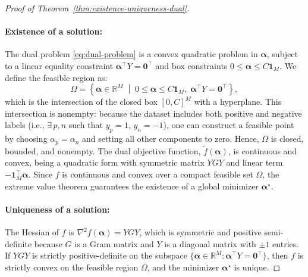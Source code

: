 \begin{proof}[Proof of Theorem~\ref{thm:existence-uniqueness-dual}]{}
	\vspace{-0.4cm}
	\paragraph{Existence of a solution:}
	The dual problem \eqref{eq:dual-problem} is a convex quadratic problem in $\symbf{\alpha}$, subject to a linear equality constraint $\symbf{\alpha}^\top Y = \symbf{0}^\top$ and box constraints $0 \leq \symbf{\alpha} \leq C\symbf{1}_M$. We define the feasible region as:
	\[
		\Omega = \left\{ \symbf{\alpha} \in \mathbb{R}^M \;\middle|\; 0 \leq \symbf{\alpha} \leq C\symbf{1}_M, \;\symbf{\alpha}^\top Y = \symbf{0}^\top \right\},
	\]
	which is the intersection of the closed box $[0, C]^M$ with a hyperplane. This intersection is nonempty: because the dataset includes both positive and negative labels (i.e., $\exists\,p,n$ such that $y_p = 1$, $y_n = -1$), one can construct a feasible point by choosing $\alpha_p = \alpha_n$ and setting all other components to zero. Hence, $\Omega$ is closed, bounded, and nonempty.
	\medskip
	The dual objective function, \(\tilde{f}(\symbf{\alpha})\), is continuous and convex, being a quadratic form with symmetric matrix $YGY$ and linear term $-\symbf{1}_M^\top \symbf{\alpha}$. Since $f$ is continuous and convex over a compact feasible set $\Omega$, the extreme value theorem guarantees the existence of a global minimizer $\symbf{\alpha}^\star$.
	\paragraph{Uniqueness of a solution:} The Hessian of $f$ is $\nabla^2 f(\symbf{\alpha}) = YGY$, which is symmetric and positive semi-definite because $G$ is a Gram matrix and $Y$ is a diagonal matrix with $\pm 1$ entries.
	If $YGY$ is strictly positive-definite on the subspace $\{\symbf{\alpha} \in \mathbb{R}^M : \symbf{\alpha}^\top Y = \symbf{0}^\top\}$, then $f$ is strictly convex on the feasible region $\Omega$, and the minimizer $\symbf{\alpha}^\star$ is unique.
\end{proof}
